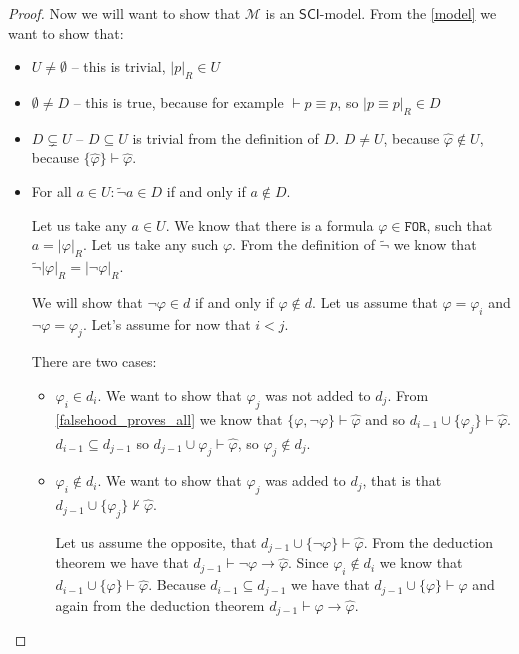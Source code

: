 \documentclass{article}
\theoremstyle{definition}
\theoremstyle{definition}
\theoremstyle{definition}
\newcommand*{\id}{\equiv}
\newcommand*{\ra}{\rightarrow}
\newcommand*{\FOR}{\texttt{FOR}}
\newcommand{\SCI}{$\mathsf{SCI}$\xspace}
\begin{document}
\begin{proof}
    Now we will want to show that $\mathcal{M}$ is an \SCI-model. From the
    \cref{model} we want to show that:
    \begin{itemize}
        \item $U \not = \emptyset$ -- this is trivial, $|p|_R \in U$
        \item $\emptyset \not = D$ -- this is true, because for example $\vdash p \id p$, so $|p \id p|_R \in D$
        \item $D \subsetneq U$ --  $D \subseteq U$ is trivial from the definition of $D$. $D \not = U$, because $\hat{\varphi} \not \in U$, because $\{\hat{\varphi}\} \vdash \hat{\varphi}$.
        \item For all $a \in U: \tilde{\lnot} a \in D$ if and only if $a \not \in D$.

              Let us take any $a \in U$. We know that there is a formula $\varphi \in \FOR$,
              such that $a = |\varphi|_R$. Let us take any such $\varphi$. From the
              definition of $\tilde{\lnot}$ we know that $\tilde{\lnot}|\varphi|_R = |\lnot
                  \varphi|_R$.

              We will show that $\lnot \varphi \in d$ if and only if $\varphi \not \in d$.
              Let us assume that $\varphi = \varphi_i$ and $\lnot \varphi = \varphi_j$. Let's
              assume for now that $i < j$.

              There are two cases:
              \begin{itemize}
                  \item $\varphi_i \in d_i$. We want to show that $\varphi_j$ was not added to $d_j$. From \cref{falsehood_proves_all} we know that $\{\varphi, \lnot \varphi\} \vdash \hat{\varphi}$ and so $d_{i-1} \cup \{\varphi_j\} \vdash \hat{\varphi}$. $d_{i-1} \subseteq d_{j-1}$ so $d_{j-1} \cup {\varphi_j} \vdash \hat{\varphi}$, so $\varphi_j \not \in d_j$.
                  \item $\varphi_i \not \in d_i$. We want to show that $\varphi_j$ was added to $d_j$, that is that $d_{j-1} \cup \{\varphi_j\} \not \vdash \hat{\varphi}$.

                        Let us assume the opposite, that $d_{j-1} \cup \{\lnot \varphi\} \vdash
                            \hat{\varphi}$. From the deduction theorem we have that $d_{j-1} \vdash \lnot
                            \varphi \ra \hat{\varphi}$. Since $\varphi_i \not \in d_i$ we know that
                        $d_{i-1} \cup \{\varphi\} \vdash \hat{\varphi}$. Because $d_{i-1} \subseteq
                            d_{j-1}$ we have that $d_{j-1} \cup \{\varphi\} \vdash \hat{\varphi}$ and again
                        from the deduction theorem $d_{j-1} \vdash \varphi \ra \hat{\varphi}$.


\end{itemize}
\end{itemize}
\end{proof}
\end{document}

